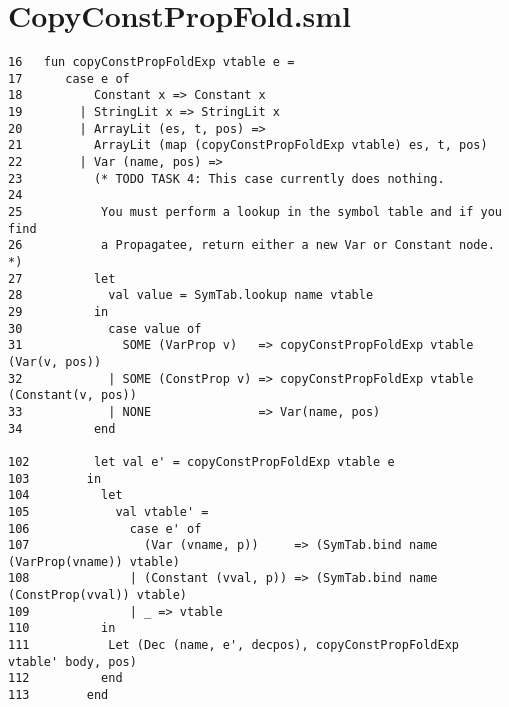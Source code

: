 \documentclass[paper=a4, fontsize=11pt]{scrartcl} %
\numberwithin{equation}{section} %
\numberwithin{figure}{section} %
\numberwithin{table}{section} %
\begin{document}
\pagebreak
\chapter{CopyConstPropFold.sml}
\begin{lstlisting}
16   fun copyConstPropFoldExp vtable e =
17      case e of
18          Constant x => Constant x
19        | StringLit x => StringLit x
20        | ArrayLit (es, t, pos) =>
21          ArrayLit (map (copyConstPropFoldExp vtable) es, t, pos)
22        | Var (name, pos) =>
23          (* TODO TASK 4: This case currently does nothing.
24        
25           You must perform a lookup in the symbol table and if you find
26           a Propagatee, return either a new Var or Constant node. *)
27          let
28            val value = SymTab.lookup name vtable
29          in
30            case value of
31              SOME (VarProp v)   => copyConstPropFoldExp vtable (Var(v, pos))
32            | SOME (ConstProp v) => copyConstPropFoldExp vtable (Constant(v, pos))
33            | NONE               => Var(name, pos)
34          end

102 		let val e' = copyConstPropFoldExp vtable e
103        in
104          let
105            val vtable' = 
106              case e' of
107                (Var (vname, p))     => (SymTab.bind name (VarProp(vname)) vtable)
108              | (Constant (vval, p)) => (SymTab.bind name (ConstProp(vval)) vtable)
109              | _ => vtable
110          in
111           Let (Dec (name, e', decpos), copyConstPropFoldExp vtable' body, pos)
112          end
113        end
\end{lstlisting}
\end{document}

